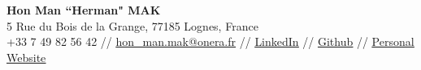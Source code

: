 \documentclass[a4paper,11pt]{article}
\begin{document}

\begin{center}
    \textbf{\Large Hon Man ``Herman" MAK} \\ \vspace{1pt}
    5 Rue du Bois de la Grange, 77185 Lognes, France\\
    \small +33 7 49 82 56 42 // \href{mailto:hon_man.mak@onera.fr}{\underline{hon\_man.mak@onera.fr}} // %
    \href{https://www.linkedin.com/in/herman-hm-mak/}{\underline{LinkedIn}} // %
    \href{https://github.com/hermanmakhm}{\underline{Github}} // %
    \href{https://hermanmak.com}{\underline{Personal Website}}%
\end{center}


\end{document}
